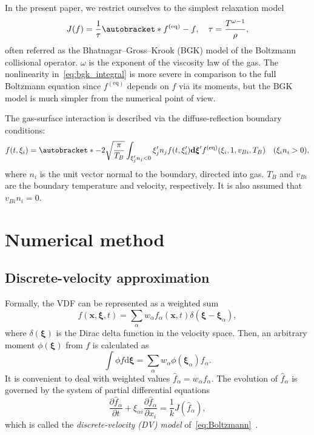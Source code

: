 \documentclass{article}
\newcommand{\dd}{\mathrm{d}}
\newcommand{\pder}[2][]{\frac{\partial#1}{\partial#2}}
\DeclarePairedDelimiter\autobracket()       %
\newcommand{\br}[1]{\autobracket*{#1}}
\newcommand{\dxi}{\boldsymbol{\dd\xi}}
\newcommand{\bxi}{{\boldsymbol{\xi}}}
\newcommand{\bxia}{\bxi_\alpha}
\newcommand{\bx}{\boldsymbol{x}}
\newcommand{\xiai}{\xi_{\alpha i}}
\newcommand{\equil}[1]{#1^\mathrm{(eq)}}
\begin{document}
In the present paper, we restrict ourselves to the simplest relaxation model~\cite{Krook1954, Welander1954}
\begin{equation}\label{eq:bgk_integral}
    J(f) = \frac1\tau\br{\equil{f}-f}, \quad \tau = \frac{T^{\omega-1}}{\rho},
\end{equation}
often referred as the Bhatnagar--Gross--Krook (BGK) model of the Boltzmann collisional operator.
\(\omega\) is the exponent of the viscosity law of the gas.
The nonlinearity in~\eqref{eq:bgk_integral} is more severe in comparison to the full Boltzmann equation
since \(\equil{f}\) depends on \(f\) via its moments,
but the BGK model is much simpler from the numerical point of view.

The gas-surface interaction is described via the diffuse-reflection boundary conditions:
\begin{equation}\label{eq:diffuse}
    f(t,\xi_i) = \br{-2\sqrt\frac\pi{T_B} \int_{\xi'_jn_j<0}\xi'_jn_jf(t,\xi'_i)\dxi'}
        \equil{f}(\xi_i,1,v_{Bi},T_B) \quad (\xi_in_i>0),
\end{equation}
where \(n_i\) is the unit vector normal to the boundary, directed into gas.
\(T_B\) and \(v_{Bi}\) are the boundary temperature and velocity, respectively.
It is also assumed that \(v_{Bi}n_i = 0\).

\section{Numerical method}\label{sec:numerics}

\subsection{Discrete-velocity approximation}\label{sec:dv}

Formally, the VDF can be represented as a weighted sum
\begin{equation}\label{eq:discrete_velocity}
    f(\bx,\bxi,t) = \sum_\alpha w_\alpha f_\alpha(\bx,t)\delta(\bxi-\bxia),
\end{equation}
where \(\delta(\bxi)\) is the Dirac delta function in the velocity space.
Then, an arbitrary moment \(\phi(\bxi)\) from \(f\) is calculated as
\begin{equation}\label{eq:cubature}
    \int \phi f\dxi = \sum_\alpha w_\alpha \phi(\bxia) f_\alpha.
\end{equation}
It is convenient to deal with weighted values \(\hat{f}_\alpha = w_\alpha f_\alpha\).
The evolution of \(\hat{f}_\alpha\) is governed by the system of partial differential equations
\begin{equation}\label{eq:dvm}
    \pder[\hat{f}_\alpha]{t} + \xiai\pder[\hat{f}_\alpha]{x_i} = \frac1kJ(\hat{f}_\alpha),
\end{equation}
which is called the \emph{discrete-velocity (DV) model} of~\eqref{eq:Boltzmann}~\cite{Cabannes1980}.
\end{document}

